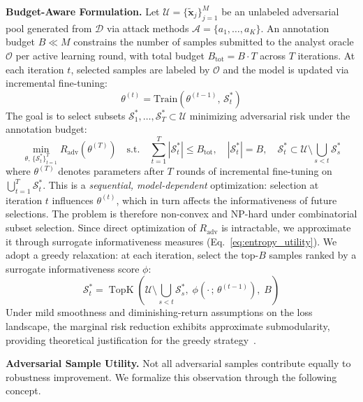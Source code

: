 \documentclass[review,1p,times,number]{elsarticle}
\begin{document}
\textbf{Budget-Aware Formulation.} Let
$\mathcal{U} = \{\tilde{\mathbf{x}}_j\}_{j=1}^{M}$ be an unlabeled
adversarial pool generated from $\mathcal{D}$ via attack methods
$\mathcal{A} = \{a_1,\ldots,a_K\}$. An annotation budget $B \ll M$
constrains the number of samples submitted to the analyst oracle
$\mathcal{O}$ per active learning round, with total budget
$B_{\mathrm{tot}} = B \cdot T$ across $T$ iterations. At each
iteration $t$, selected samples are labeled by $\mathcal{O}$ and the
model is updated via incremental fine-tuning:
\begin{equation}
\theta^{(t)} = \mathrm{Train}\!\left(\theta^{(t-1)},\,\mathcal{S}_t^*\right)
\label{eq:update}
\end{equation}
The goal is to select subsets
$\mathcal{S}_1^*, \ldots, \mathcal{S}_T^* \subset \mathcal{U}$
minimizing adversarial risk under the annotation budget:
\begin{equation}
\min_{\theta,\,\{\mathcal{S}_t^*\}_{t=1}^T}
R_{\mathrm{adv}}(\theta^{(T)})
\quad \text{s.t.} \quad
\sum_{t=1}^{T}|\mathcal{S}_t^*| \leq B_{\mathrm{tot}}, \quad
|\mathcal{S}_t^*| = B, \quad
\mathcal{S}_t^* \subset \mathcal{U} \setminus
\bigcup_{s < t}\mathcal{S}_s^*
\label{eq:core_problem}
\end{equation}
where $\theta^{(T)}$ denotes parameters after $T$ rounds of
incremental fine-tuning on $\bigcup_{t=1}^T \mathcal{S}_t^*$.
This is a \textit{sequential, model-dependent} optimization:
selection at iteration $t$ influences $\theta^{(t)}$, which in turn
affects the informativeness of future selections. The problem is
therefore non-convex and NP-hard under combinatorial subset selection.
Since direct optimization of $R_{\mathrm{adv}}$ is intractable, we
approximate it through surrogate informativeness measures
(Eq.~\ref{eq:entropy_utility}). We adopt a greedy relaxation: at
each iteration, select the top-$B$ samples ranked by a surrogate
informativeness score $\phi$:
\begin{equation}
\mathcal{S}_t^* = \operatorname{TopK}\!\left(
  \mathcal{U} \setminus \textstyle\bigcup_{s<t}\mathcal{S}_s^*,\;
  \phi(\cdot\,;\,\theta^{(t-1)}),\; B
\right)
\label{eq:greedy_selection}
\end{equation}
Under mild smoothness and diminishing-return assumptions on the loss
landscape, the marginal risk reduction exhibits approximate
submodularity, providing theoretical justification for the greedy
strategy~\cite{settles2009active}.

\textbf{Adversarial Sample Utility.} Not all adversarial samples
contribute equally to robustness improvement. We formalize this
observation through the following concept.
\end{document}
